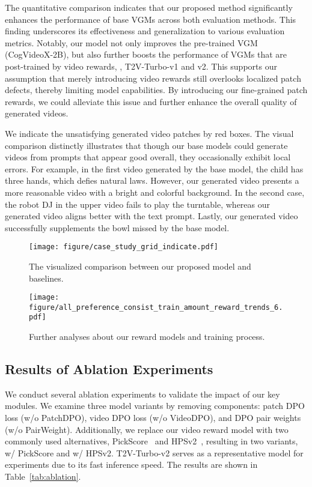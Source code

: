 The quantitative comparison indicates that our proposed method significantly enhances the performance of base VGMs across both evaluation methods. This finding underscores its effectiveness and generalization to various evaluation metrics. 
Notably, our model not only improves the pre-trained VGM (CogVideoX-2B), but also further boosts the performance of VGMs that are post-trained by video rewards, \ie, T2V-Turbo-v1 and v2. This supports our assumption that merely introducing video rewards still overlooks localized patch defects, thereby limiting model capabilities. By introducing our fine-grained patch rewards, we could alleviate this issue and further enhance the overall quality of generated videos.

We indicate the unsatisfying generated video patches by red boxes. The visual comparison distinctly illustrates that though our base models could generate videos from prompts that appear good overall, they occasionally exhibit local errors. For example, in the first video generated by the base model, the child has three hands, which defies natural laws. However, our generated video presents a more reasonable video with a bright and colorful background. In the second case, the robot DJ in the upper video fails to play the turntable, whereas our generated video aligns better with the text prompt. Lastly, our generated video successfully supplements the bowl missed by the base model.


\begin{figure*}[h]
    \centering
    \texttt{[image: figure/case\_study\_grid\_indicate.pdf]}
    \caption{The visualized comparison between our proposed model \ours{} and baselines.
    }
    \label{fig:case}
\end{figure*}
\begin{figure*}[ht]
    \centering
    \texttt{[image: figure/all\_preference\_consist\_train\_amount\_reward\_trends\_6.pdf]}
    \caption{Further analyses about our reward models and training process.
    }
    \label{fig:three-analyses}
\end{figure*}
\subsection{Results of Ablation Experiments}\label{sec:ablation}
We conduct several ablation experiments to validate the impact of our key modules. We examine three model variants by removing components: patch DPO loss (w/o PatchDPO), video DPO loss (w/o VideoDPO), and DPO pair weights (w/o PairWeight). Additionally, we replace our video reward model with two commonly used alternatives, PickScore~\cite{PickScore} and HPSv2~\cite{HPSv2}, resulting in two variants, w/ PickScore and w/ HPSv2. T2V-Turbo-v2 serves as a representative model for experiments due to its fast inference speed. The results are shown in Table~\ref{tab:ablation}. 

